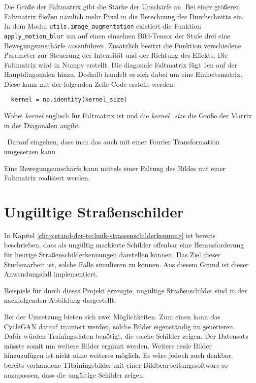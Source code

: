 
Die Größe der Faltmatrix gibt die Stärke der Unschärfe an. Bei einer größeren Faltmatrix fließen nämlich mehr Pixel in die Berechnung des Durchschnitts ein. In dem Modul \texttt{utils.image_augmentation} existiert die Funktion \texttt{apply_motion_blur} um auf einen einzelnen Bild-Tensor der Stufe drei eine Bewegungsunschärfe auszuführen. Zusätzlich besitzt die Funktion verschiedene Parameter zur Steuerung der Intensität und der Richtung des Effekts. Die Faltmatrix wird in Numpy erstellt. Die diagonale Faltmatrix fügt 1en auf der Hauptdiagonalen hinzu. Deshalb handelt es sich dabei um eine Einheitsmatrix. Diese kann mit der folgenden Zeile Code erstellt werden:

\begin{code}
  \begin{verbatim}
  kernel = np.identity(kernel_size)
  \end{verbatim}
  \end{code}

Wobei \emph{kernel} englisch für Faltmatrix ist und die \emph{kernel_size} die Größe der Matrix in der Diagonalen angibt. 

~Darauf eingehen, dass man das auch mit einer Fourier Transformation umgesetzen kann~

Eine Bewegungsunschärfe kann mittels einer Faltung des Bildes mit einer Faltmatrix realisiert werden.

\section{Ungültige Straßenschilder}
In Kapitel \ref{chap:stand-der-technik-strassenschilderkennung} ist bereits beschrieben, dass als ungültig markierte Schilder offenbar eine Herausforderung für heutige Straßenschilderkennungen darstellen können. Das Ziel dieser Studienarbeit ist, solche Fälle simulieren zu können. Aus diesem Grund ist dieser Anwendungsfall implementiert.

Beispiele für durch dieses Projekt erzeugte, ungültige Straßenschilder sind in der nachfolgenden Abbildung dargestellt:

Bei der Umsetzung bieten sich zwei Möglichkeiten. Zum einen kann das \ac{CycleGAN} darauf trainiert werden, solche Bilder eigenständig zu generieren. Dafür würden Trainingsdaten benötigt, die solche Schilder zeigen. Der Datensatz müsste somit um weitere Bilder ergänzt werden. Weitere reale Bilder hinzuzufügen ist nicht ohne weiteres möglich. Es wäre jedoch auch denkbar, bereits vorhandene TRainingsbilder mit einer Bildbearbeitungssoftware so anzupassen, dass die ungültige Schilder zeigen.


